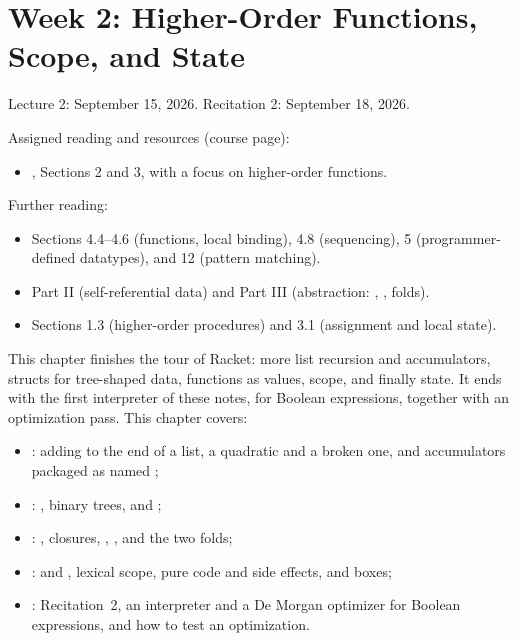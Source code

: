 \chapter{Week 2: Higher-Order Functions, Scope, and State}
\label{ch:week2}

Lecture 2: September 15, 2026. Recitation 2: September 18, 2026.

Assigned reading and resources (course page):
\begin{itemize}
  \item \cite{TYR}, Sections 2 and 3, with a focus on higher-order functions.
\end{itemize}

Further reading:
\begin{itemize}
  \item \cite{RacketGuide} Sections 4.4--4.6 (functions, local binding), 4.8 (sequencing), 5 (programmer-defined datatypes), and 12 (pattern matching).
  \item \cite{HtDP} Part II (self-referential data) and Part III (abstraction: , , folds).
  \item \cite{SICP} Sections 1.3 (higher-order procedures) and 3.1 (assignment and local state).
\end{itemize}

This chapter finishes the tour of Racket: more list recursion and accumulators, structs for tree-shaped data, functions as values, scope, and finally state. It ends with the first interpreter of these notes, for Boolean expressions, together with an optimization pass. This chapter covers:
\begin{itemize}
  \item {}: adding to the end of a list, a quadratic  and a broken one, and accumulators packaged as named ;
  \item {}: , binary trees, and ;
  \item {}: , closures, , , and the two folds;
  \item {}:  and , lexical scope, pure code and side effects, and boxes;
  \item {}: Recitation~2, an interpreter and a De Morgan optimizer for Boolean expressions, and how to test an optimization.
\end{itemize}






